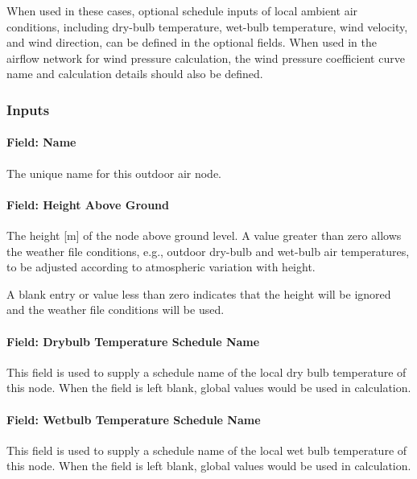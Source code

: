 When used in these cases, optional schedule inputs of local ambient air conditions, including dry-bulb temperature, wet-bulb temperature, wind velocity, and wind direction, can be defined in the optional fields. When used in the airflow network for wind pressure calculation, the wind pressure coefficient curve name and calculation details should also be defined.

\subsubsection{Inputs}\label{inputs-5-001}

\paragraph{Field: Name}\label{field-name-5-001}

The unique name for this outdoor air node.

\paragraph{Field: Height Above Ground}\label{field-height-above-ground}

The height {[}m{]} of the node above ground level. A value greater than zero allows the weather file conditions, e.g., outdoor dry-bulb and wet-bulb air temperatures, to be adjusted according to atmospheric variation with height.

A blank entry or value less than zero indicates that the height will be ignored and the weather file conditions will be used.

\paragraph{Field: Drybulb Temperature Schedule Name}\label{field-drybulb-temperature-schedule-name}

This field is used to supply a schedule name of the local dry bulb temperature of this node. When the field is left blank, global values would be used in calculation.

\paragraph{Field: Wetbulb Temperature Schedule Name}\label{field-wetbulb-temperature-schedule-name}

This field is used to supply a schedule name of the local wet bulb temperature of this node. When the field is left blank, global values would be used in calculation.

